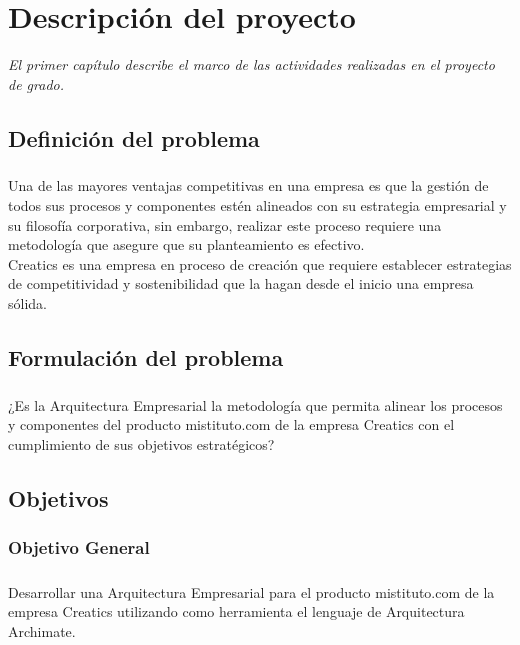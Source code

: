 \chapter{Descripción del proyecto}
\label{chap:Problema}
\textit{El primer capítulo describe el marco de las actividades realizadas en el proyecto de grado.}
\vfill
\minitoc
\newpage

\section{Definición del problema}
  \paragraph*{}
  Una de las mayores ventajas competitivas en una empresa es que la gestión de todos sus procesos y componentes estén alineados con su estrategia empresarial y su filosofía corporativa, sin embargo, realizar este proceso requiere una metodología que asegure que su planteamiento es efectivo. \\
  Creatics es una empresa en proceso de creación que requiere establecer estrategias de competitividad y sostenibilidad que la hagan desde el inicio una empresa sólida.

\section{Formulación del problema}
  \paragraph*{}
  ¿Es la Arquitectura Empresarial la metodología que permita alinear los procesos y componentes del producto mistituto.com de la empresa Creatics con el cumplimiento de sus objetivos estratégicos?

\section{Objetivos}
  \subsection{Objetivo General}
    \paragraph*{}
    Desarrollar una Arquitectura Empresarial para el producto mistituto.com de la empresa Creatics utilizando como herramienta el lenguaje de Arquitectura Archimate.

